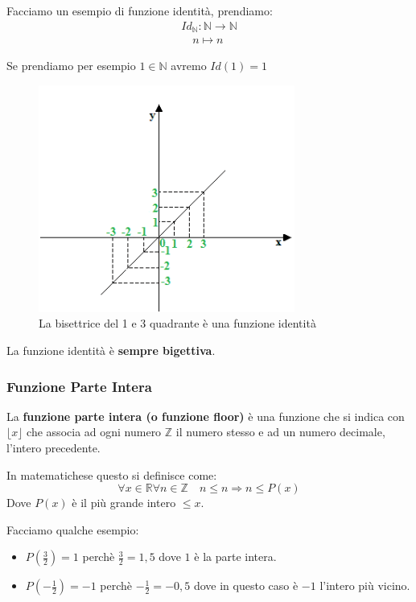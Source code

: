 \documentclass{article}
\theoremstyle{definition}
\begin{document}
Facciamo un esempio di funzione identità, prendiamo:
\begin{align*}
        Id_{\mathbb{N}} : \mathbb{N} \to \mathbb{N} \\
        \quad n \mapsto n
\end{align*}

Se prendiamo per esempio $ 1 \in \mathbb{N} $ avremo $ Id(1) = 1 $ \par
\begin{figure}[h]
        \centering
                \includegraphics[width=0.75\textwidth]{es_funz_identita.png}
        \caption{La bisettrice del 1 e 3 quadrante è una funzione identità}\label{fig:esempio_funzione_identità}
\end{figure}
La funzione identità è \textbf{sempre bigettiva}.


\subsubsection{Funzione Parte Intera}\label{sec:funzione_parte_intera}
La \textbf{funzione parte intera (o funzione floor)} è una funzione che si indica con $ \lfloor x \rfloor $ che associa ad ogni numero $ \mathbb{Z} $  il numero stesso e ad un numero decimale, l'intero precedente. \par
In matematichese questo si definisce come:
\begin{equation*}
        \forall x \in \mathbb{R} \forall n \in \mathbb{Z} \quad n \le n \Rightarrow n \le P(x)
\end{equation*}
Dove $ P(x) $ è il più grande intero $ \le  x$. \par
Facciamo qualche esempio: 
\begin{itemize}
        \item $ P(\frac{3}{2}) = 1$ perchè $ \frac{3}{2} = 1,5 $ dove $ 1 $ è la parte intera.   
        \item $ P( - \frac{1}{2}) = -1$ perchè $ - \frac{1}{2} = -0,5 $ dove in questo caso è $ -1 $ l'intero più vicino. 
\end{itemize} 
\end{document}
